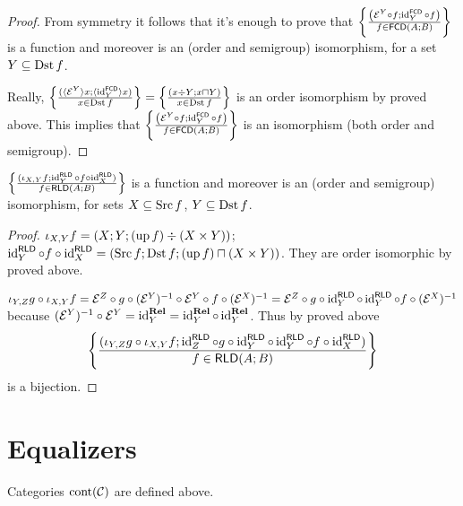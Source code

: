 \begin{proof}
  From symmetry it follows that it's enough to prove that $\left\{ \frac{ \left(
  \mathcal{E}^Y \circ f ; \operatorname{id}^{\mathsf{FCD}}_Y \circ f \right)
  }{ f \in \mathsf{FCD} (A ; B) }\right\}$ is a
  function and moreover is an (order and semigroup) isomorphism, for a set $Y
  \subseteq \operatorname{Dst} f$.
  
  Really, $\left\{ \frac{ (\langle \mathcal{E}^Y \rangle x ; \langle
  \operatorname{id}^{\mathsf{FCD}}_Y \rangle x) }{ x
  \in \operatorname{Dst} f }\right\} = \left\{ \frac{ (x \div Y ; x \sqcap Y) }{
  x \in \operatorname{Dst} f }\right\}$ is an order isomorphism by proved
  above. This implies that $\left\{ \frac{ \left( \mathcal{E}^Y \circ f ;
  \operatorname{id}^{\mathsf{FCD}}_Y \circ f \right) }{
  f \in \mathsf{FCD} (A ; B) }\right\}$ is an isomorphism
  (both order and semigroup).
\end{proof}

\begin{prop}
  $\left\{ \frac{ (\iota_{X, Y} f ; \operatorname{id}^{\mathsf{RLD}}_Y \circ f \circ
  \operatorname{id}^{\mathsf{RLD}}_X) }{ f \in
  \mathsf{RLD} (A ; B) }\right\}$ is a function and moreover is an
  (order and semigroup) isomorphism, for sets $X \subseteq \operatorname{Src} f$, $Y
  \subseteq \operatorname{Dst} f$.
\end{prop}

\begin{proof}
  $\iota_{X, Y} f = (X ; Y ; (\operatorname{up} f) \div (X \times Y))$;
  $\operatorname{id}^{\mathsf{RLD}}_Y \circ f \circ
  \operatorname{id}^{\mathsf{RLD}}_X = (\operatorname{Src} f ; \operatorname{Dst} f ;
  (\operatorname{up} f) \sqcap (X \times Y))$. They are order isomorphic by proved
  above.
  
  $\iota_{Y, Z} g \circ \iota_{X, Y} f =\mathcal{E}^Z \circ g \circ
  (\mathcal{E}^Y)^{- 1} \circ \mathcal{E}^Y \circ f \circ (\mathcal{E}^X)^{-
  1} =\mathcal{E}^Z \circ g \circ \operatorname{id}^{\mathsf{RLD}}_Y \circ
  \operatorname{id}^{\mathsf{RLD}}_Y \circ f \circ (\mathcal{E}^X)^{- 1}$
  because $(\mathcal{E}^Y)^{- 1} \circ \mathcal{E}^Y =
  \operatorname{id}^{\mathbf{Rel}}_Y = \operatorname{id}^{\mathbf{Rel}}_Y
  \circ \operatorname{id}^{\mathbf{Rel}}_Y$. Thus by proved above
  \[ \left\{ \frac{ (\iota_{Y, Z} g \circ \iota_{X, Y} f ;
     \operatorname{id}^{\mathsf{RLD}}_Z \circ g \circ
     \operatorname{id}^{\mathsf{RLD}}_Y \circ \operatorname{id}^{\mathsf{RLD}}_Y
     \circ f \circ \operatorname{id}^{\mathsf{RLD}}_X) }{
     f \in \mathsf{RLD} (A ; B) }\right\} \]
  is a bijection.
\end{proof}

\section{Equalizers}

Categories $\operatorname{cont} (\mathcal{C})$ are defined above.


